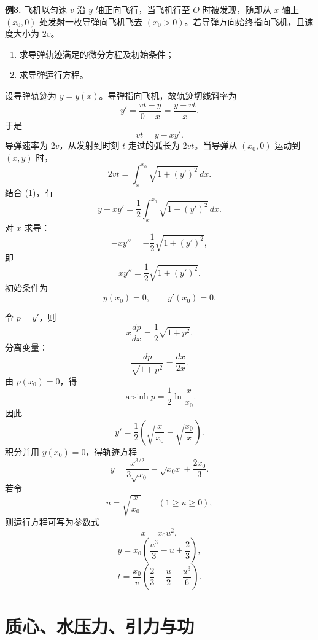 \begin{problemblock}
\textbf{例3.} 飞机以匀速 \(v\) 沿 \(y\) 轴正向飞行，当飞机行至 \(O\) 时被发现，随即从 \(x\) 轴上 \((x_0,0)\) 处发射一枚导弹向飞机飞去 \((x_0>0)\)。若导弹方向始终指向飞机，且速度大小为 \(2v\)。

\begin{enumerate}[label=(\arabic*)]
\item 求导弹轨迹满足的微分方程及初始条件；
\item 求导弹运行方程。
\end{enumerate}
\end{problemblock}
\begin{solutionblock}
设导弹轨迹为 \(y=y(x)\)。导弹指向飞机，故轨迹切线斜率为
\[
y'=\frac{vt-y}{0-x}=\frac{y-vt}{x}.
\]
于是
\[
vt=y-xy'. \tag{1}
\]
导弹速率为 \(2v\)，从发射到时刻 \(t\) 走过的弧长为 \(2vt\)。当导弹从 \((x_0,0)\) 运动到 \((x,y)\) 时，
\[
2vt=\int_x^{x_0}\sqrt{1+(y')^2}\,dx.
\]
结合 (1)，有
\[
y-xy'=\frac12\int_x^{x_0}\sqrt{1+(y')^2}\,dx.
\]
对 \(x\) 求导：
\[
-xy''=-\frac12\sqrt{1+(y')^2},
\]
即
\[
xy''=\frac12\sqrt{1+(y')^2}.
\]
初始条件为
\[
y(x_0)=0,\qquad y'(x_0)=0.
\]

令 \(p=y'\)，则
\[
x\frac{dp}{dx}=\frac12\sqrt{1+p^2}.
\]
分离变量：
\[
\frac{dp}{\sqrt{1+p^2}}=\frac{dx}{2x}.
\]
由 \(p(x_0)=0\)，得
\[
\operatorname{arsinh}p=\frac12\ln\frac{x}{x_0}.
\]
因此
\[
y'=\frac12\left(\sqrt{\frac{x}{x_0}}-\sqrt{\frac{x_0}{x}}\right).
\]
积分并用 \(y(x_0)=0\)，得轨迹方程
\[
y=\frac{x^{3/2}}{3\sqrt{x_0}}-\sqrt{x_0x}+\frac{2x_0}{3}.
\]
若令
\[
u=\sqrt{\frac{x}{x_0}}\qquad (1\ge u\ge0),
\]
则运行方程可写为参数式
\[
x=x_0u^2,
\]
\[
y=x_0\left(\frac{u^3}{3}-u+\frac23\right),
\]
\[
t=\frac{x_0}{v}\left(\frac23-\frac u2-\frac{u^3}{6}\right).
\]
\end{solutionblock}

\section{质心、水压力、引力与功}

